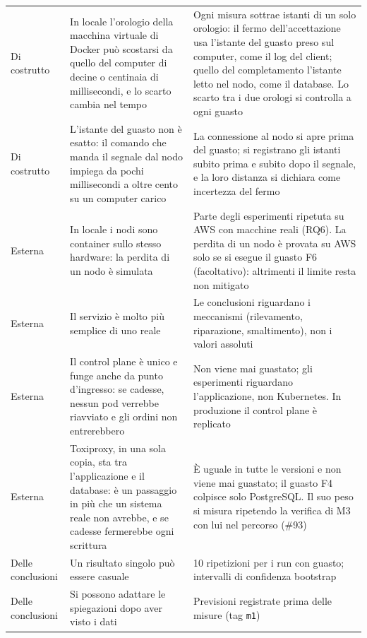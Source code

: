 \begin{longtable}{@{}>{\raggedright\arraybackslash}p{2.3cm}QQ@{}}
Di costrutto & In locale l'orologio della macchina virtuale di Docker può scostarsi da quello del computer di decine o centinaia di millisecondi, e lo scarto cambia nel tempo & Ogni misura sottrae istanti di un solo orologio: il fermo dell'accettazione usa l'istante del guasto preso sul computer, come il log del client; quello del completamento l'istante letto nel nodo, come il database. Lo scarto tra i due orologi si controlla a ogni guasto \\
Di costrutto & L'istante del guasto non è esatto: il comando che manda il segnale dal nodo impiega da pochi millisecondi a oltre cento su un computer carico & La connessione al nodo si apre prima del guasto; si registrano gli istanti subito prima e subito dopo il segnale, e la loro distanza si dichiara come incertezza del fermo \\
Esterna & In locale i nodi sono container sullo stesso hardware: la perdita di un nodo è simulata & Parte degli esperimenti ripetuta su AWS con macchine reali (RQ6). La perdita di un nodo è provata su AWS solo se si esegue il guasto F6 (facoltativo): altrimenti il limite resta non mitigato \\
Esterna & Il servizio è molto più semplice di uno reale & Le conclusioni riguardano i meccanismi (rilevamento, riparazione, smaltimento), non i valori assoluti \\
Esterna & Il control plane è unico e funge anche da punto d'ingresso: se cadesse, nessun pod verrebbe riavviato e gli ordini non entrerebbero & Non viene mai guastato; gli esperimenti riguardano l'applicazione, non Kubernetes. In produzione il control plane è replicato \\
Esterna & Toxiproxy, in una sola copia, sta tra l'applicazione e il database: è un passaggio in più che un sistema reale non avrebbe, e se cadesse fermerebbe ogni scrittura & È uguale in tutte le versioni e non viene mai guastato; il guasto F4 colpisce solo PostgreSQL. Il suo peso si misura ripetendo la verifica di M3 con lui nel percorso (\#93) \\
Delle conclusioni & Un risultato singolo può essere casuale & 10 ripetizioni per i run con guasto; intervalli di confidenza bootstrap \\
Delle conclusioni & Si possono adattare le spiegazioni dopo aver visto i dati & Previsioni registrate prima delle misure (tag \texttt{m1}) \\
\end{longtable}

